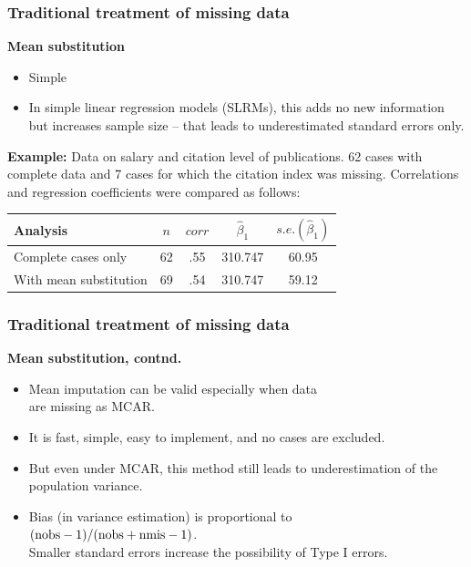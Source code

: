 \documentclass{beamer}
\begin{document}
\begin{frame}
\frametitle{Traditional treatment of missing data}
\textbf{Mean substitution}
\vspace{0.2cm}
  \begin{itemize}
  \item[\ding{51}] Simple
  \item[\ding{55}] In simple linear regression models (SLRMs), this adds no new information but increases sample size – that leads to underestimated standard errors only.
  \end{itemize} 
  \vspace{0.2cm}
\textbf{Example:} Data on salary and citation level of publications. 62 cases with complete data and 7 cases for which the citation index was missing. Correlations and regression coefficients were compared as follows:

\begin{table}
\begin{tabular}{l c c c c}
\toprule
Analysis & $n$ & $corr$ & $\widehat{\beta}_1$ & $\textit{s.e.}(\widehat{\beta}_1)$\\
\midrule
Complete cases only & 62 & .55 &  310.747 & 60.95 \\
With mean substitution & 69 & .54 &  310.747 & 59.12 \\
\bottomrule
\end{tabular}
\end{table}
\end{frame}
\begin{frame}
\frametitle{Traditional treatment of missing data}
\textbf{Mean substitution, contnd.} \\
\medskip
\begin{itemize}
    \item Mean imputation can be valid especially when data \\are missing as MCAR.
    \smallskip
    \item It is fast, simple, easy to implement, and no cases are excluded.
    \smallskip
    \item But even under MCAR, this method still leads to underestimation of the population variance. 
    \smallskip
    \item Bias (in variance estimation) is proportional to \\
    $( \textnormal{nobs} - 1)/( \textnormal{nobs} + \textnormal{nmis} - 1)$. \\Smaller standard errors increase the possibility of Type I errors.
\end{itemize}
\end{frame}
\end{document}
